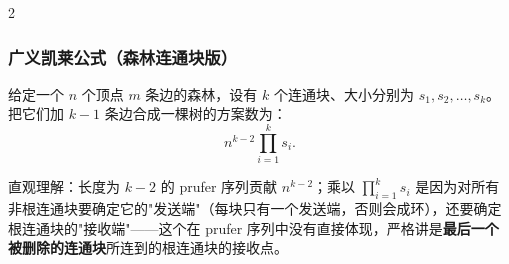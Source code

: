 \begin{multicols*}{2}
		\subsubsection{广义凯莱公式（森林连通块版）}

		给定一个 $n$ 个顶点 $m$ 条边的森林，设有 $k$ 个连通块、大小分别为 $s_1, s_2, \dots, s_k$。把它们加 $k - 1$ 条边合成一棵树的方案数为：
		$$
		n^{k-2} \prod_{i=1}^{k} s_i.
		$$

		直观理解：长度为 $k - 2$ 的 prufer 序列贡献 $n^{k - 2}$；乘以 $\prod_{i=1}^{k} s_i$ 是因为对所有非根连通块要确定它的"发送端"（每块只有一个发送端，否则会成环），还要确定根连通块的"接收端"——这个在 prufer 序列中没有直接体现，严格讲是\textbf{最后一个被删除的连通块}所连到的根连通块的接收点。


	\end{multicols*}

